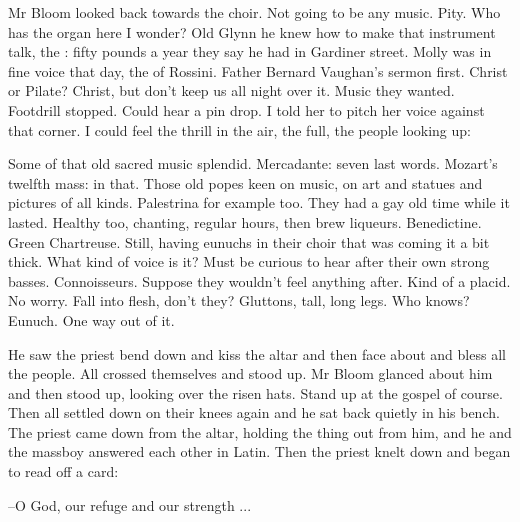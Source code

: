 Mr Bloom looked back towards the choir.
Not going to be any music.
Pity.
Who has the organ here I wonder?
Old Glynn he knew how to make that instrument talk,
the :
fifty pounds a year they say he had in Gardiner street.
Molly was in fine voice that day,
the  of Rossini.
Father Bernard Vaughan's sermon first.
Christ or Pilate?
Christ,
but don't keep us all night over it.
Music they wanted.
Footdrill stopped.
Could hear a pin drop.
I told her to pitch her voice against that corner.
I could feel the thrill in the air,
the full,
the people looking up:


Some of that old sacred music splendid.
Mercadante: seven last words.
Mozart's twelfth mass:
 in that.
Those old popes keen on music,
on art and statues and pictures of all kinds.
Palestrina for example too.
They had a gay old time while it lasted.
Healthy too,
chanting,
regular hours,
then brew liqueurs.
Benedictine.
Green Chartreuse.
Still, having eunuchs in their choir
that was coming it a bit thick.
What kind of voice is it?
Must be curious to hear after their own strong basses.
Connoisseurs.
Suppose they wouldn't feel anything after.
Kind of a placid.
No worry.
Fall into flesh, don't they?
Gluttons, tall, long legs.
Who knows?
Eunuch.
One way out of it.

He saw the priest bend down and kiss the altar
and then face about and bless all the people.
All crossed themselves and stood up.
Mr Bloom glanced about him
and then stood up,
looking over the risen hats.
Stand up at the gospel of course.
Then all settled down on their knees again
and he sat back quietly in his bench.
The priest came down from the altar,
holding the thing out from him,
and he and the massboy answered each other in Latin.
Then the priest knelt down and began to read off a card:

--O God, our refuge and our strength ...

